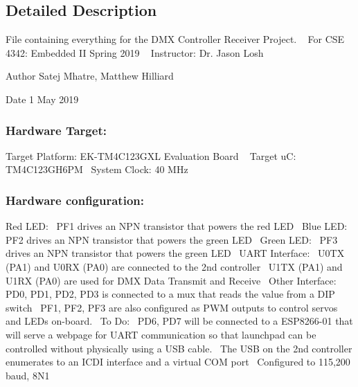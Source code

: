 \subsection{Detailed Description}
File containing everything for the D\+MX Controller Receiver Project. ~\newline
 For C\+SE 4342\+: Embedded II Spring 2019 ~\newline
 Instructor\+: Dr. Jason Losh~\newline
 

\begin{DoxyAuthor}{Author}
Satej Mhatre, Matthew Hilliard 
\end{DoxyAuthor}
\begin{DoxyDate}{Date}
1 May 2019 \subsubsection*{Hardware Target\+: }
\end{DoxyDate}
Target Platform\+: E\+K-\/\+T\+M4\+C123\+G\+XL Evaluation Board ~\newline
 Target uC\+: T\+M4\+C123\+G\+H6\+PM~\newline
 System Clock\+: 40 M\+Hz~\newline
 \subsubsection*{Hardware configuration\+: }

Red L\+ED\+:~\newline
 P\+F1 drives an N\+PN transistor that powers the red L\+ED~\newline
 Blue L\+ED\+:~\newline
 P\+F2 drives an N\+PN transistor that powers the green L\+ED~\newline
 Green L\+ED\+:~\newline
 P\+F3 drives an N\+PN transistor that powers the green L\+ED~\newline
 U\+A\+RT Interface\+:~\newline
 U0\+TX (P\+A1) and U0\+RX (P\+A0) are connected to the 2nd controller~\newline
 U1\+TX (P\+A1) and U1\+RX (P\+A0) are used for D\+MX Data Transmit and Receive~\newline
 Other Interface\+:~\newline
 P\+D0, P\+D1, P\+D2, P\+D3 is connected to a mux that reads the value from a D\+IP switch~\newline
 P\+F1, P\+F2, P\+F3 are also configured as P\+WM outputs to control servos and L\+E\+Ds on-\/board.~\newline
 To Do\+:~\newline
 P\+D6, P\+D7 will be connected to a E\+S\+P8266-\/01 that will serve a webpage for U\+A\+RT communication so that launchpad can be controlled without physically using a U\+SB cable.~\newline
 The U\+SB on the 2nd controller enumerates to an I\+C\+DI interface and a virtual C\+OM port~\newline
 Configured to 115,200 baud, 8N1~\newline
 

